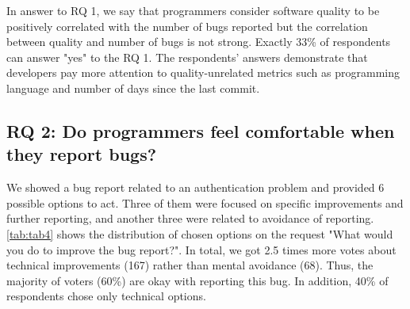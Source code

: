 \documentclass[11pt,review,sigplan,nonacm,natbib=false]{acmart}
\begin{document}
In answer to RQ 1, we say that programmers consider software quality to be positively correlated with the number of bugs reported but the correlation between quality and number of bugs is not strong. Exactly 33\% of respondents can answer "yes" to the RQ 1. The respondents' answers demonstrate that developers pay more attention to quality-unrelated metrics such as programming language and number of days since the last commit.

\subsection{RQ 2: Do programmers feel comfortable when they report bugs?}

We showed a bug report related to an authentication problem and provided 6 possible options to act. Three of them were focused on specific improvements and further reporting, and another three were related to avoidance of reporting. \cref{tab:tab4} shows the distribution of chosen options on the request "What would you do to improve the bug report?". In total, we got 2.5 times more votes about technical improvements (167) rather than mental avoidance (68). Thus, the majority of voters (60\%) are okay with reporting this bug. In addition, 40\% of respondents chose only technical options.

\end{document}
